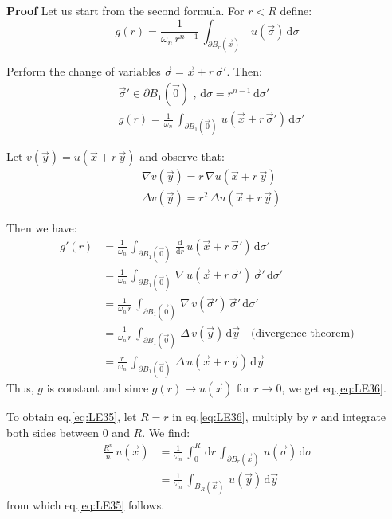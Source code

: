 \documentclass[../main.tex]{subfiles}
\begin{document}
\textbf{Proof}  Let us start from the second formula. For $r < R$ define:
\begin{equation} \label{eq:LE37}
    g(r) = \frac{1}{\omega_n \, r^{n-1}} \, \int_{\partial B_r(\vec{x})} \, u(\vec{\sigma}) \, \mathrm{d} \sigma
\end{equation}

Perform the change of variables $\vec{\sigma} = \vec{x} + r \, \vec{\sigma}'$. Then:
\begin{align}
    & \vec{\sigma}' \in \partial B_1(\vec{0}) \text{ ,  } \mathrm{d} \sigma = r^{n-1} \, \mathrm{d} \sigma'  \label{eq:LE38} \\
    & g(r) = \frac{1}{\omega_n} \, \int_{\partial B_1(\vec{0})} \, u(\vec{x} + r \, \vec{\sigma}') \, \mathrm{d} \sigma' \label{eq:LE39}
\end{align}

Let $v(\vec{y}) = u(\vec{x} + r \, \vec{y})$ and observe that:
\begin{align}
    & \nabla v(\vec{y}) = r \, \nabla u(\vec{x} + r \, \vec{y}) \label{eq:LE40} \\
    & \Delta v(\vec{y}) = r^2 \, \Delta u(\vec{x} + r \, \vec{y}) \label{eq:LE41}
\end{align}

Then we have:
\begin{align}
    g'(r) &= \frac{1}{\omega_n} \, \int_{\partial B_1(\vec{0})} \, \frac{\mathrm{d}}{\mathrm{d} r} \, u(\vec{x} + r \, \vec{\sigma}') \, \mathrm{d} \sigma' \label{eq:LE42} \\
    &= \frac{1}{\omega_n} \, \int_{\partial B_1(\vec{0})} \, \nabla \, u(\vec{x} + r \, \vec{\sigma}') \, \vec{\sigma}' \, \mathrm{d} \sigma' \label{eq:LE43} \\
    &= \frac{1}{\omega_n \, r} \, \int_{\partial B_1(\vec{0})} \, \nabla \, v(\vec{\sigma}') \, \vec{\sigma}' \, \mathrm{d} \sigma' \label{eq:LE44} \\
    &= \frac{1}{\omega_n \, r} \, \int_{\partial B_1(\vec{0})} \, \Delta \, v(\vec{y}) \, \mathrm{d} \vec{y} \quad \text{(divergence theorem)} \label{eq:LE45} \\
    &= \frac{r}{\omega_n} \, \int_{\partial B_1(\vec{0})} \, \Delta \, u(\vec{x} + r \, \vec{y}) \, \mathrm{d} \vec{y} \label{eq:LE46}
\end{align}
Thus, $g$ is constant and since $g(r) \rightarrow u(\vec{x})$ for $r \rightarrow 0$, we get eq.\ref{eq:LE36}.

To obtain eq.\ref{eq:LE35}, let $R = r$ in eq.\ref{eq:LE36}, multiply by $r$ and integrate both sides between 0 and $R$. We find:
\begin{align}
    \frac{R^n}{n} \, u(\vec{x}) &= \frac{1}{\omega_n} \, \int_0^R \, \mathrm{d} r \, \int_{\partial B_r(\vec{x})} \, u(\vec{\sigma}) \, \mathrm{d} \sigma \label{eq:LE47} \\
    &= \frac{1}{\omega_n} \, \int_{B_R(\vec{x})} \, u(\vec{y}) \, \mathrm{d} \vec{y} \label{eq:LE48}
\end{align}
from which eq.\ref{eq:LE35} follows. \hfill \Box
\end{document}
